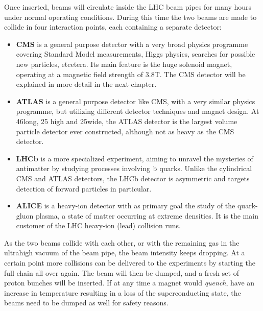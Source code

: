 Once inserted, beams will circulate inside the LHC beam pipes for many hours under
normal operating conditions. During this time the two beams are made to collide in four interaction
points, each containing a separate detector: 
\begin{itemize}
  \item \textbf{CMS} is a general purpose detector with a very broad physics programme covering
Standard Model measurements, Higgs physics, searches for possible new particles, etcetera. Its
main feature is the huge solenoid magnet, operating at a magnetic field strength of 3.8\unit{T}. The
CMS detector will be explained in more detail in the next chapter. 
  \item \textbf{ATLAS} is a general purpose detector like CMS, with a very similar physics
programme, but utilizing different detector techniques and magnet design. At 46\meter long, 25\meter
high and 25\meter wide, the ATLAS detector is the largest volume particle detector ever
constructed, although not as heavy as the CMS detector. 
  \item \textbf{LHCb} is a more specialized experiment, aiming to unravel the mysteries of
antimatter by studying processes involving $\mathrm{b}$ quarks. Unlike the cylindrical CMS and ATLAS
detectors, the LHCb detector is asymmetric and targets detection of forward particles in particular.
  \item \textbf{ALICE} is a heavy-ion detector with as primary goal the study of the quark-gluon
plasma, a state of matter occurring at extreme densities. It is the main customer of the LHC
heavy-ion (lead) collision runs.
\end{itemize}
As the two beams collide with each other, or with the remaining gas in the ultrahigh vacuum of
the beam pipe, the beam
intensity keeps dropping. At a certain point more collisions can be delivered to the experiments by
starting the full chain all over again. The beam will then be dumped, and a fresh set of proton
bunches will be inserted. 
If at any time a magnet would \textit{quench}, have an increase in temperature resulting in a loss
of the superconducting state, the beams need to be dumped as well for safety reasons.  

